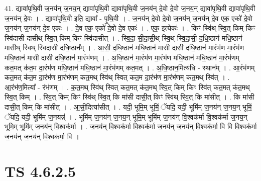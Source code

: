 \documentclass[17pt]{extarticle}
\begin{document}
41. द्यावा॑पृथि॒वी ज॒नय॑न् ज॒नय॒न् द्यावा॑पृथि॒वी द्यावा॑पृथि॒वी ज॒नय॑न् दे॒वो दे॒वो ज॒नय॒न् द्यावा॑पृथि॒वी द्यावा॑पृथि॒वी ज॒नय॑न् दे॒वः । . द्यावा॑पृथि॒वी इति॒ द्यावा᳚ - पृ॒थि॒वी । . ज॒नय॑न् दे॒वो दे॒वो ज॒नय॑न् ज॒नय॑न् दे॒व एक॒ एको॑ दे॒वो ज॒नय॑न् ज॒नय॑न् दे॒व एकः॑ । . दे॒व एक॒ एको॑ दे॒वो दे॒व एकः॑ । . एक॒ इत्येकः॑ । . किꣳ स्वि॑थ् स्वि॒त् किम् किꣳ स्वि॑दासी दासीथ् स्वि॒त् किम् किꣳ स्वि॑दासीत् । . स्वि॒दा॒ सी॒दा॒सी॒थ् स्वि॒थ् स्वि॒दा॒सी॒ द॒धि॒ष्ठान॑ मधि॒ष्ठान॑ मासीथ् स्विथ् स्विदासी दधि॒ष्ठान᳚म् । . आ॒सी॒ द॒धि॒ष्ठान॑ मधि॒ष्ठान॑ मासी दासी दधि॒ष्ठान॑ मा॒रंभ॑ण मा॒रंभ॑ण मधि॒ष्ठान॑ मासी दासी दधि॒ष्ठान॑ मा॒रंभ॑णम् । . अ॒धि॒ष्ठान॑ मा॒रंभ॑ण मा॒रंभ॑ण मधि॒ष्ठान॑ मधि॒ष्ठान॑ मा॒रंभ॑णम् कत॒मत् क॑त॒म दा॒रंभ॑ण मधि॒ष्ठान॑ मधि॒ष्ठान॑ मा॒रंभ॑णम् कत॒मत् । . अ॒धि॒ष्ठान॒मित्य॑धि - स्थान᳚म् । . आ॒रंभ॑णम् कत॒मत् क॑त॒म दा॒रंभ॑ण मा॒रंभ॑णम् कत॒मथ् स्वि॑थ् स्वित् कत॒म दा॒रंभ॑ण मा॒रंभ॑णम् कत॒मथ् स्वि॑त् । . आ॒रंभ॑ण॒मित्या᳚ - रंभ॑णम् । . क॒त॒मथ् स्वि॑थ् स्वित् कत॒मत् क॑त॒मथ् स्वि॒त् किम् किꣳ स्वि॑त् कत॒मत् क॑त॒मथ् स्वि॒त् किम् । . स्वि॒त् किम् किꣳ स्वि॑थ् स्वि॒त् कि मा॑सी दासी॒त् किꣳ स्वि॑थ् स्वि॒त् कि मा॑सीत् । . कि मा॑सी दासी॒त् किम् कि मा॑सीत् । . आ॒सी॒दित्या॑सीत् । . यदी॒ भूमि॒म् भूमिं॒ ॅयदि॒ यदी॒ भूमि॑म् ज॒नय॑न् ज॒नय॒न् भूमिं॒ ॅयदि॒ यदी॒ भूमि॑म् ज॒नयन्न्॑ । . भूमि॑म् ज॒नय॑न् ज॒नय॒न् भूमि॒म् भूमि॑म् ज॒नय॑न् वि॒श्वक॑र्मा वि॒श्वक॑र्मा ज॒नय॒न् भूमि॒म् भूमि॑म् ज॒नय॑न् वि॒श्वक॑र्मा । . ज॒नय॑न् वि॒श्वक॑र्मा वि॒श्वक॑र्मा ज॒नय॑न् ज॒नय॑न् वि॒श्वक॑र्मा॒ वि वि वि॒श्वक॑र्मा ज॒नय॑न् ज॒नय॑न् वि॒श्वक॑र्मा॒ वि । \newline
\pagebreak
{}

\section{ TS 4.6.2.5 }
\end{document}
